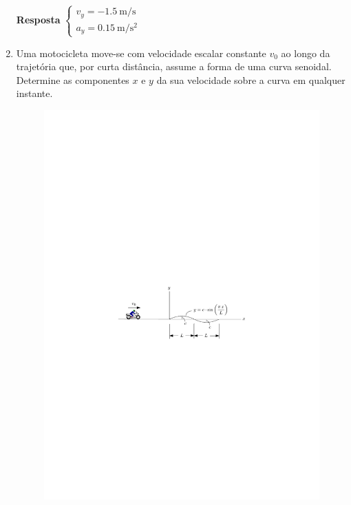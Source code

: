 \documentclass[a4paper,12pt]{article}
\begin{document}
\begin{enumerate}
		\vspace{-4.35cm}
		\textbf{Resposta}
		$
		\begin{cases}
		v_{y}=\SI{-1.5}{\meter/\second}\\
		a_{y}=\SI{0.15}{\meter/\second^{2}}
		\end{cases}
		$
		
		\vspace{3.5cm}
		\item Uma motocicleta move-se com velocidade escalar constante $v_{0}$ ao longo da trajetória que, por curta distância, assume a forma de uma curva senoidal. Determine as componentes $x$ e $y$ da sua velocidade
		sobre a curva em qualquer instante.
		
		\begin{figure}[h!]
			\centering
			\includegraphics[scale=1.2]{images/draw_3}
		\end{figure}
		

\end{enumerate}
\end{document}
